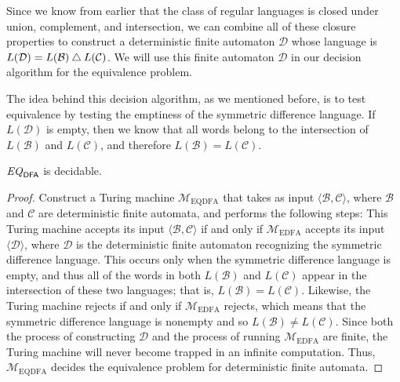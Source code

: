 Since we know from earlier that the class of regular languages is closed under union, complement, and intersection, we can combine all of these closure properties to construct a deterministic finite automaton $\mathcal{D}$ whose language is $L(\mathcal{D}) = L(\mathcal{B}) \mathbin{\triangle} L(\mathcal{C})$. We will use this finite automaton $\mathcal{D}$ in our decision algorithm for the equivalence problem.

The idea behind this decision algorithm, as we mentioned before, is to test equivalence by testing the emptiness of the symmetric difference language. If $L(\mathcal{D})$ is empty, then we know that all words belong to the intersection of $L(\mathcal{B})$ and $L(\mathcal{C})$, and therefore $L(\mathcal{B}) = L(\mathcal{C})$.

\begin{theorem}\label{thm:EQDFAdecidable}
$\mathit{EQ}_{\textsf{DFA}}$ is decidable.

\begin{proof}
Construct a Turing machine $\mathcal{M}_{\mathrm{EQDFA}}$ that takes as input $\langle \mathcal{B}, \mathcal{C} \rangle$, where $\mathcal{B}$ and $\mathcal{C}$ are deterministic finite automata, and performs the following steps:
This Turing machine accepts its input $\langle \mathcal{B}, \mathcal{C} \rangle$ if and only if $\mathcal{M}_{\mathrm{EDFA}}$ accepts its input $\langle \mathcal{D} \rangle$, where $\mathcal{D}$ is the deterministic finite automaton recognizing the symmetric difference language. This occurs only when the symmetric difference language is empty, and thus all of the words in both $L(\mathcal{B})$ and $L(\mathcal{C})$ appear in the intersection of these two languages; that is, $L(\mathcal{B}) = L(\mathcal{C})$. Likewise, the Turing machine rejects if and only if $\mathcal{M}_{\mathrm{EDFA}}$ rejects, which means that the symmetric difference language is nonempty and so $L(\mathcal{B}) \neq L(\mathcal{C})$. Since both the process of constructing $\mathcal{D}$ and the process of running $\mathcal{M}_{\mathrm{EDFA}}$ are finite, the Turing machine will never become trapped in an infinite computation. Thus, $\mathcal{M}_{\mathrm{EQDFA}}$ decides the equivalence problem for deterministic finite automata.
\end{proof}
\end{theorem}

